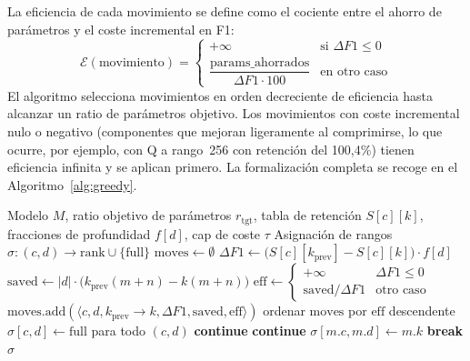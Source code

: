 La eficiencia de cada movimiento se define como el cociente entre el
ahorro de parámetros y el coste incremental en F1:
\begin{equation}
    \mathcal{E}(\text{movimiento}) =
    \begin{cases}
        +\infty & \text{si } \Delta F1 \leq 0 \\[4pt]
        \dfrac{\text{params\_ahorrados}}{\Delta F1 \cdot 100} & \text{en otro caso}
    \end{cases}
    \label{eq:eficiencia}
\end{equation}
El algoritmo selecciona movimientos en orden decreciente de eficiencia
hasta alcanzar un ratio de parámetros objetivo. Los movimientos con coste
incremental nulo o negativo (componentes que mejoran ligeramente al
comprimirse, lo que ocurre, por ejemplo, con Q a rango~256 con retención
del 100{,}4\%) tienen eficiencia infinita y se aplican primero. La
formalización completa se recoge en el Algoritmo~\ref{alg:greedy}.

\begin{algorithm}[H]
\caption{Greedy SVD Compression (informed by sensitivity)}
\label{alg:greedy}
\begin{algorithmic}[1]
\Require Modelo $M$, ratio objetivo de parámetros $r_{\text{tgt}}$,
         tabla de retención $S[c][k]$, fracciones de profundidad $f[d]$,
         cap de coste $\tau$
\Ensure Asignación de rangos $\sigma:(c,d)\!\to\!\text{rank}\cup\{\text{full}\}$
\State $\text{moves}\gets\emptyset$
      \State $\Delta F1 \gets \big(S[c][k_{\text{prev}}]-S[c][k]\big)\cdot f[d]$
      \State $\text{saved}\gets |d|\cdot\big(k_{\text{prev}}(m{+}n)-k(m{+}n)\big)$
      \State $\text{eff} \gets \begin{cases}+\infty & \Delta F1\le 0\\ \text{saved}/\Delta F1 & \text{otro caso}\end{cases}$
      \State $\text{moves}.\text{add}(\langle c,d,k_{\text{prev}}{\to}k,\Delta F1,\text{saved},\text{eff}\rangle)$
    \EndFor
  \EndFor
\EndFor
\State ordenar $\text{moves}$ por $\text{eff}$ descendente
\State $\sigma[c,d]\gets\text{full}$ para todo $(c,d)$
   \textbf{continue} \EndIf
   \textbf{continue} \EndIf
  \State $\sigma[m.c,m.d]\gets m.k$
   \textbf{break} \EndIf
\EndFor
\State \Return $\sigma$
\end{algorithmic}
\end{algorithm}


